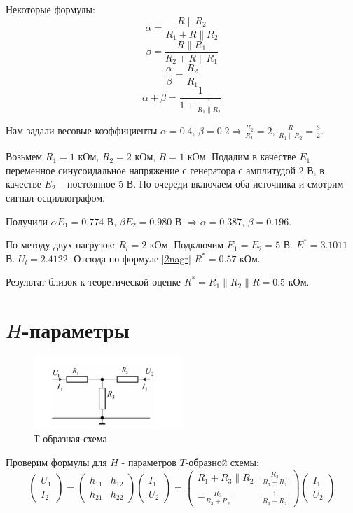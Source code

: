 \documentclass[a4paper, 12pt]{article}
\begin{document}
Некоторые формулы:
\[ \alpha = \frac{R \| R_2}{R_1 + R \| R_2} \]
\[ \beta  = \frac{R \| R_1}{R_2 + R \| R_1} \]
\[ \frac{\alpha}{\beta} = \frac{R_2}{R_1}   \]
\[ \alpha + \beta = \frac{1}{1 + \frac{1}{R_1 \| R_2}} \]

Нам задали весовые коэффициенты $\alpha = 0.4$,
$\beta = 0.2 \Rightarrow \frac{R_2}{R_1} = 2$, $\frac{R}{R_1 \| R_2} = \frac{3}{2}$.

Возьмем $R_1 = 1$ кОм, $R_2 = 2$ кОм, $R = 1$ кОм. Подадим в качестве $E_1$
переменное синусоидальное напряжение с генератора с амплитудой 2 В,
в качестве $E_2$ -- постоянное 5 В.
По очереди включаем оба источника и смотрим сигнал осциллографом.

Получили $\alpha E_1 = 0.774$ В, $\beta E_2 = 0.980$ В
$\Rightarrow \alpha = 0.387$, $\beta = 0.196$.

По методу двух нагрузок: $R_l = 2$ кОм. Подключим $E_1 = E_2 = 5$ В. $E^* = 3.1011$ В.
$U_l = 2.4122$. Отсюда по формуле \ref{2nagr} $R^* = 0.57$ кОм.

Результат близок к теоретической оценке $R^* = R_1 \| R_2 \| R = 0.5$ кОм.

\newpage

\section{$H$-параметры}
\begin{figure}[h]
  \centering
  \includegraphics[width=0.5\textwidth]{t-scheme.png}
  \caption{Т-образная схема}
\end{figure}

Проверим формулы для $H$ - параметров $T$-образной схемы:
\begin{equation}
  \begin{pmatrix}
    U_1 \\
    I_2
  \end{pmatrix}
  =
  \begin{pmatrix}
    h_{11} & h_{12} \\
    h_{21} & h_{22}
  \end{pmatrix}
  \begin{pmatrix}
    I_1\\
    U_2
  \end{pmatrix}
  =
  \begin{pmatrix}
    R_1 + R_3 \| R_2 & \frac{R_3}{R_3 + R_2} \\
    -\frac{R_3}{R_3 + R_2} & \frac{1}{R_3 + R_2}
  \end{pmatrix}
  \begin{pmatrix}
    I_1 \\
    U_2
  \end{pmatrix}
  \label{eq:hpar}
\end{equation}
\end{document}
